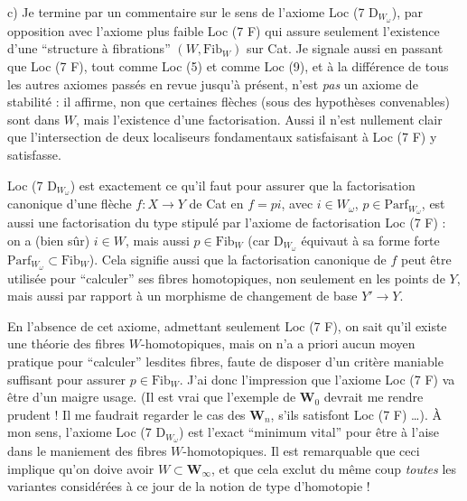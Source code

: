 \documentclass[11pt]{article}
\newcommand{\printedpage}[1]{\marginpar{\footnotesize p.~#1}}
\newcommand{\msp}[1]{\marginpar{\footnotesize [#1]}}
\begin{document}
c) Je termine par un commentaire sur le sens de l'axiome Loc (7 D$_{W_\omega}$), par opposition avec l'axiome plus faible Loc (7 F) qui assure seulement l'existence d'une “structure à fibrations” $(W, \mathrm{Fib}_W)$ sur Cat. Je signale aussi en passant que Loc (7 F), tout comme Loc (5) et comme Loc (9), et à la différence de tous les autres axiomes passés en revue jusqu'à présent, n'est \textit{pas} un axiome de stabilité : il affirme, non que certaines flèches (sous des hypothèses convenables) sont dans $W$, mais l'existence d'une factorisation. Aussi il n'est
\msp{page 90}
nullement clair que l'intersection de deux localiseurs fondamentaux satisfaisant à Loc (7 F) y satisfasse.

Loc (7 D$_{W_\omega}$) est exactement ce qu'il faut pour assurer que la factorisation canonique d'une flèche $f : X \longrightarrow Y$ de Cat en $f = pi$, avec $i \in W_\omega$, $p \in \mathrm{Parf}_{W_\omega}$, est aussi une factorisation du type stipulé par l'axiome de factorisation Loc (7 F) : on a (bien sûr) $i \in W$, mais aussi $p \in \mathrm{Fib}_W$ (car D$_{W_\omega}$ équivaut à sa forme forte $\mathrm{Parf}_{W_\omega} \subset \mathrm{Fib}_W$). Cela signifie aussi que la factorisation canonique de $f$ peut être utilisée pour “calculer” ses fibres homotopiques, non seulement en les points de $Y$, mais aussi par rapport à un morphisme de changement de base $Y' \longrightarrow Y$.

En l'absence de cet axiome,
\msp{page 91}
\printedpage{47}
admettant seulement Loc (7 F), on sait qu'il existe une théorie des fibres $W$-homotopiques, mais on n'a a priori aucun moyen pratique pour “calculer” lesdites fibres, faute de disposer d'un critère maniable suffisant pour assurer $p \in \mathrm{Fib}_W$. J'ai donc l'impression que l'axiome Loc (7 F) va être d'un maigre usage. (Il est vrai que l'exemple de $\mathbf{W}_0$ devrait me rendre prudent ! Il me faudrait regarder le cas des $\mathbf{W}_n$, s'ils satisfont Loc (7 F) \ldots). À mon sens, l'axiome Loc (7 D$_{W_\omega}$) est l'exact “minimum vital” pour être à l'aise dans le maniement des fibres $W$-homotopiques. Il est remarquable que ceci implique qu'on doive avoir $W \subset \mathbf{W}_\infty$, et que cela exclut du même coup \textit{toutes} les variantes considérées à ce jour de la notion de type d'homotopie !
\end{document}
